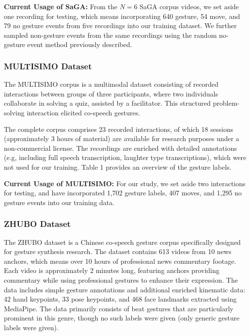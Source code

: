 \documentclass[11pt,smallheadings,cleardoublepage=empty,tocflat,numbers=noenddot,twoside,captions=tableheading]{scrbook}
\begin{document}
\begin{refsection}
\textbf{Current Usage of SaGA:} From the $N=6$ SaGA corpus videos, we set aside one recording for testing, which means incorporating 640 gesture, 54 move, and 79 no gesture events from five recordings into our training dataset. We further sampled non-gesture events from the same recordings using the random no-gesture event method previously described. 

\subsubsection{MULTISIMO Dataset}
The MULTISIMO corpus \parencite{koutsombogeraModelingCollaborativeMultimodal2018} is a multimodal dataset consisting of recorded interactions between groups of three participants, where two individuals collaborate in solving a quiz, assisted by a facilitator. This structured problem-solving interaction elicited co-speech gestures.

The complete corpus comprises 23 recorded interactions, of which 18 sessions (approximately 3 hours of material) are available for research purposes under a non-commercial license. The recordings are enriched with detailed annotations (e.g, including full speech transcription, laughter type transcriptions), which were not used for our training. Table 1 provides an overview of the gesture labels.

\textbf{Current Usage of MULTISIMO:} For our study, we set aside two interactions for testing, and have incorporated 1,702 gesture labels, 407 moves, and 1,295 no gesture events into our training data.

\subsubsection{ZHUBO Dataset}
The ZHUBO dataset \parencite{baoEditableCoSpeechGesture2024} is a Chinese co-speech gesture corpus specifically designed for gesture synthesis research. The dataset contains 613 videos from 10 news anchors, which means over 10 hours of professional news commentary footage. Each video is approximately 2 minutes long, featuring anchors providing commentary while using professional gestures to enhance their expression. The data includes simple gesture annotations and additional enriched kinematic data: 42 hand keypoints, 33 pose keypoints, and 468 face landmarks extracted using MediaPipe. The data primarily consists of beat gestures that are particularly prominent in this genre, though no such labels were given (only generic gesture labels were given). 


\end{refsection}
\end{document}
